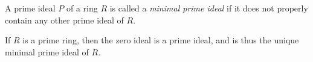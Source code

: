 \documentclass{article}
\begin{document}
A prime ideal $P$ of a ring $R$ is called a {\it minimal prime ideal} if it does not properly contain any other prime ideal of $R$.

If $R$ is a prime ring, then the zero ideal is a prime ideal, and is thus the unique minimal prime ideal of $R$.
\end{document}
